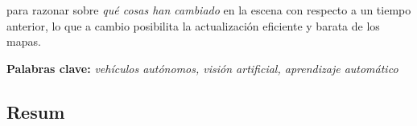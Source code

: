 \begin{otherlanguage}{spanish}
para razonar sobre \textit{qué cosas han cambiado} en la escena con respecto a un tiempo anterior, lo que a cambio posibilita la actualización eficiente y barata de los mapas.

\vspace{1mm}
\textbf{Palabras clave:} \textit{vehículos autónomos, visión artificial, aprendizaje automático}



\end{otherlanguage}



\begin{otherlanguage}{catalan}
\cleardoublepage
\chapter*{Resum}
\vspace{-24mm}


\end{otherlanguage}
